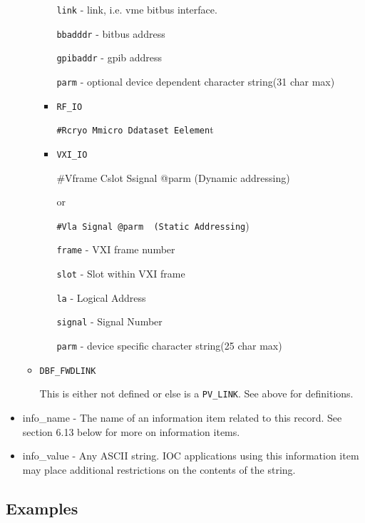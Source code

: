\begin{itemize}
\begin{itemize}
\begin{itemize}
\verb|link| - link, i.e. vme bitbus interface.

\verb|bbadddr| - bitbus address

\verb|gpibaddr| - gpib address

\verb|parm| - optional device dependent character string(31 char max)

\item \verb|RF_IO|

\verb|#Rcryo Mmicro Ddataset Eelemen|t

\item \verb|VXI_IO|

\#Vframe Cslot Ssignal @parm (Dynamic addressing)

     or

\verb|#Vla Signal @parm  (Static Addressing|)

\verb|frame| - VXI frame number

\verb|slot| - Slot within VXI frame

\verb|la| - Logical Address

\verb|signal| - Signal Number

\verb|parm| - device specific character string(25 char max)

\end{itemize}

\item \verb|DBF_FWDLINK|

This is either not defined or else is a \verb|PV_LINK|. See above for definitions.

\end{itemize}

\item {}info\_name - The name of an information item related to this record. See section 6.13 below for more on 
information items.

\item {}info\_value - Any ASCII string. IOC applications using this information item may place additional restrictions on 
the contents of the string.

\end{itemize}

\subsection{Examples}

